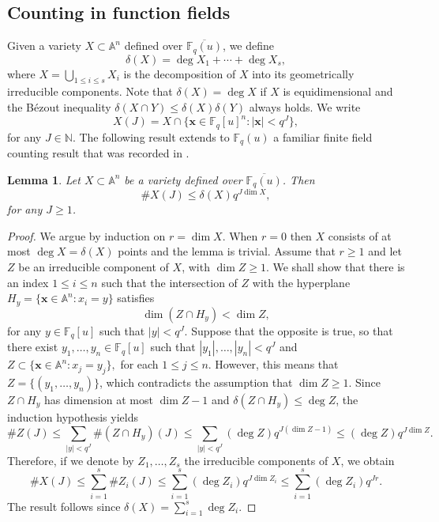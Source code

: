 \documentclass[12pt, reqno]{amsart}
\numberwithin{equation}{section}
\newcommand{\0}{\mathbf{0}}
\renewcommand{\AA}{\mathbb{A}}
\newcommand{\FF}{\mathbb{F}}
\renewcommand{\leq}{\leqslant}
\renewcommand{\geq}{\geqslant}
\newcommand{\x}{\mathbf{x}}
\renewcommand{\=}{\equiv}
\newcommand{\1}{\mathbf{1}}
\newtheorem{lemma}[theorem]{Lemma}
\theoremstyle{definition}
\begin{document}
\subsection*{Counting in function fields}
Given a variety $X \subset \AA^n$ defined over $\overline{\FF_q(u)}$, we define
$$
\delta(X) = \deg X_1 + \cdots + \deg X_s,
$$
where $X = \bigcup_{1 \leq  i \leq s} X_i$ is the decomposition of $X$ into its geometrically irreducible components. Note that $\delta(X) = \deg X$ if $X$ is equidimensional and the B\'{e}zout inequality $\delta(X \cap Y) \leq \delta(X) \delta (Y)$ always holds. We write
$$
X(J) =  X  \cap  \{ \x \in \FF_q[u]^n: |\x|< q^J   \},
$$
for any  $J \in \mathbb{N}$.
The following result extends to $\FF_q(u)$ a familiar finite field counting result that was recorded  in \cite[Lemma~2.1]{BVY}.

\begin{lemma}
\label{dimbdd}
Let $X \subset \mathbb{A}^n$ be a variety defined over  $\overline{\FF_q(u)}$. Then
$$\# X(J)  \leq \delta(X) q^{J \dim X},
$$
for any $J \geq 1$.
\end{lemma}
\begin{proof}
We argue by induction on $r = \dim X$. When $r=0$ then $X$ consists of at most $\deg X = \delta(X)$ points and the lemma is trivial.
Assume that $r \geq 1$ and let
$Z$ be an irreducible component of $X$, with  $\dim Z \geq 1$.
We shall show that there is an index $1 \leq i \leq n$ such that
the intersection of $Z$ with  the hyperplane $H_{y} = \{ \x \in \AA^n:  x_i = y \}$ satisfies
$$
\dim (Z \cap H_{y} ) < \dim Z,
$$
for any $y \in \FF_q[u]$ such that $|y|<q^J$. Suppose that the opposite is true, so that there exist $y_1,\dots, y_n \in \FF_q[u]$  such that
$|y_1|,\dots,|y_n|<q^J$ and
$
Z \subset \{ \x \in \AA^n: x_j = y_j \},
$
for each $1 \leq j \leq n$.
However, this means that $Z = \{ (y_1, \ldots, y_n) \}$, which contradicts the assumption that $\dim Z \geq 1$.
Since $Z \cap H_{y}$ has dimension at most $\dim Z -1$ and  $\delta ( Z \cap H_{y} )  \leq \deg Z$, the induction hypothesis yields
$$
\# Z(J) \leq \sum_{|y| < q^J } \#  (Z \cap H_{y} ) (J) \leq \sum_{|y| < q^J} (\deg Z) q^{J (\dim Z - 1)}  \leq  (\deg Z) q^{ J \dim Z}.
$$
Therefore, if we denote by $Z_1, \ldots, Z_s$ the irreducible components of $X$, we obtain
$$
\# X(J) \leq
\sum_{ i  = 1}^s \# Z_i(J) \leq \sum_{ i = 1}^s (\deg Z_i) q^{J \dim Z_i}  \leq  \sum_{i = 1}^s (\deg Z_i) q^{J r} .
$$
The result follows since $\delta (X) = \sum_{ i  = 1}^s \deg Z_i$.
\end{proof}
\end{document}
